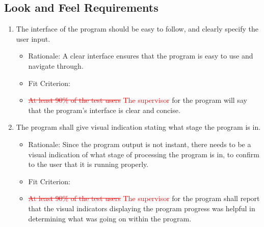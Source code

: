 \documentclass[12pt, titlepage]{article}
\begin{document}
\subsection{Look and Feel Requirements}
\begin{enumerate}[{LF}1. ] 
    \item \label{LF1} The interface of the program should be easy to follow, and clearly specify the user input.
    \begin{itemize} 
        \item Rationale: A clear interface ensures that the program is easy to use and navigate through.
        \item Fit Criterion: \item \textcolor{red}{\sout{At least 90\% of the test users} The supervisor}  for the program will say that the program's interface is clear and concise.
    \end{itemize}  
    \item \label{LF2} The program shall give visual indication stating what stage the program is in.
    \begin{itemize} 
        \item Rationale: Since the program output is not instant, there needs to be a visual indication of what stage of processing the program is in, to confirm to the user that it is running properly.
        \item Fit Criterion: \item \textcolor{red}{\sout{At least 90\% of the test users} The supervisor} for the program shall report that the visual indicators displaying the program progress was helpful in determining what was going on within the program.
    \end{itemize}
\end{enumerate}
\end{document}
